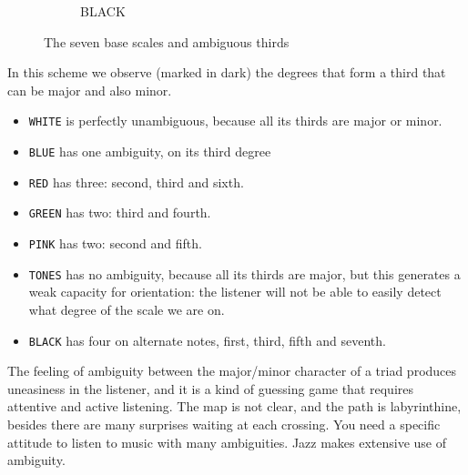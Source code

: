 \documentclass[]{report}
\providecommand{\tightlist}{%
  \setlength{\itemsep}{0pt}
  \setlength{\parskip}{0pt}
}
\begin{document}
\begin{figure}[H]
\begin{subfigure}{0.3\textwidth}
		\caption{\textsf{BLACK}}

	\end{subfigure}
	\hfill
	\caption{The seven base scales and ambiguous thirds}\label{fig:the-six-scales-and-ambiguous-thirds}
\end{figure}
In this scheme we observe (marked in dark) the degrees that form a third that can be major and also minor.
\begin{itemize} \tightlist
\item \texttt{WHITE} is perfectly unambiguous, because all its thirds are major or minor.
\item \texttt{BLUE} has one ambiguity, on its third degree
\item \texttt{RED} has three: second, third and sixth.
\item \texttt{GREEN} has two: third and fourth.
\item \texttt{PINK} has two: second and fifth.
\item \texttt{TONES} has no ambiguity, because all its thirds are major, but this generates a weak capacity for orientation: the listener will not be able to easily detect what degree of the scale we are on.
\item \texttt{BLACK} has four on alternate notes, first, third, fifth and seventh.
\end{itemize}
The feeling of ambiguity between the major/minor character of a triad produces uneasiness in the listener, and it is a kind of guessing game that requires attentive and active listening. The map is not clear, and the path is labyrinthine, besides there are many surprises waiting at each crossing. You need a specific attitude to listen to music with many ambiguities. Jazz makes extensive use of ambiguity.
\end{document}

